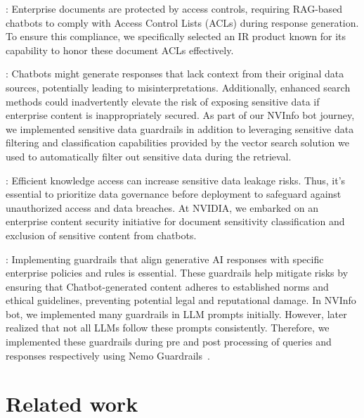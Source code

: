 \documentclass[sigconf]{acmart}
\begin{document}
: Enterprise documents are protected by access controls, requiring RAG-based chatbots to comply with Access Control Lists (ACLs) during response generation. To ensure this compliance, we specifically selected an IR product known for its capability to honor these document ACLs effectively. 

: Chatbots might generate responses that lack context from their original data sources, potentially leading to misinterpretations. Additionally, enhanced search methods could inadvertently elevate the risk of exposing sensitive data if enterprise content is inappropriately secured. As part of our NVInfo bot journey, we implemented sensitive data guardrails in addition to leveraging sensitive data filtering and classification capabilities provided by the vector search solution we used to automatically filter out sensitive data during the retrieval.

: Efficient knowledge access can increase sensitive data leakage risks. Thus, it's essential to prioritize data governance before deployment to safeguard against unauthorized access and data breaches. At NVIDIA, we embarked on an enterprise content security initiative for  document sensitivity classification and exclusion of sensitive content from chatbots.

: Implementing guardrails that align generative AI responses with specific enterprise policies and rules is essential. These guardrails help mitigate risks by ensuring that Chatbot-generated content adheres to established norms and ethical guidelines, preventing potential legal and reputational damage. In NVInfo bot, we implemented many guardrails in LLM prompts initially. However, later realized that not all LLMs follow these prompts consistently. Therefore, we implemented these guardrails during pre and post processing of queries and responses respectively using Nemo Guardrails~\cite{rebedea2023nemo}.



\section{Related work}
\end{document}
